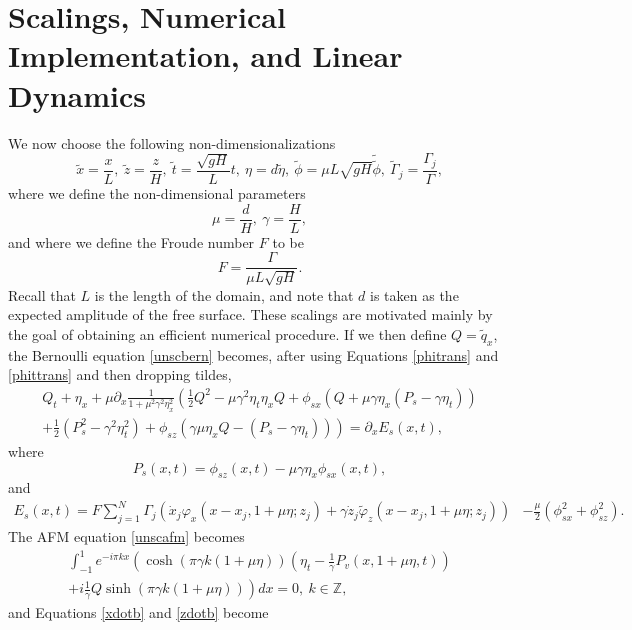 \documentclass[a4paper,11pt]{article}
\newcommand{\p}{\partial}
\begin{document}
\section{Scalings, Numerical Implementation, and Linear Dynamics}
We now choose the following non-dimensionalizations 
\[
\tilde{x} = \frac{x}{L}, ~\tilde{z} = \frac{z}{H}, ~ \tilde{t} = \frac{\sqrt{gH}}{L} t, ~ \eta = d\tilde{\eta}, ~ \tilde{\phi} = \mu L\sqrt{gH} \tilde{\tilde{\phi}}, ~ \tilde{\Gamma}_{j} = \frac{\Gamma_{j}}{\Gamma},
\]
where we define the non-dimensional parameters
\[
\mu= \frac{d}{H}, ~ \gamma = \frac{H}{L},
\]
and where we define the Froude number $F$ to be 
\[
F = \frac{\Gamma}{\mu L \sqrt{gH}}.
\]
Recall that $L$ is the length of the domain, and note that $d$ is taken as the expected amplitude of the free surface.  These scalings are motivated mainly by the goal of obtaining an efficient numerical procedure.  If we then define $Q = \tilde{q}_{x}$, the Bernoulli equation \eqref{unscbern} becomes, after using Equations \eqref{phitrans} and \eqref{phittrans} and then dropping tildes,  
\begin{multline}
Q_{t} + \eta_{x} + \mu\p_{x}\frac{1}{1+ \mu^{2}\gamma^{2}\eta_{x}^{2}} \left( \frac{1}{2}Q^{2} - \mu \gamma^{2}\eta_{t}\eta_{x}Q  +  \phi_{sx} (Q + \mu\gamma\eta_{x}( P_{s}-\gamma\eta_{t}))   \right. \\
\left. + \frac{1}{2}\left(P_{s}^{2}-\gamma^{2}\eta_{t}^{2} \right)+ \phi_{sz}\left(\gamma \mu \eta_{x}Q-\left(P_{s}-\gamma \eta_{t}\right) \right) \right)= \p_{x}E_{s}(x,t), \label{swbern}
\end{multline}
where 
\[
P_{s}(x,t) = \phi_{sz}(x,t)-\mu\gamma \eta_{x}\phi_{sx}(x,t),
\]
and
\begin{align*}
E_{s}(x,t) =  F\sum_{j=1}^{N}\Gamma_{j}\left(\dot{x}_{j}\varphi_{x}(x-x_{j},1+\mu\eta;z_{j}) + \gamma\dot{z}_{j}\tilde{\varphi}_{z}(x-x_{j},1+\mu\eta;z_{j}) \right)
& -\frac{\mu}{2}\left(\phi_{sx}^{2} + \phi_{sz}^{2}\right).
\end{align*}
The AFM equation \eqref{unscafm} becomes  
\begin{multline}
\int_{-1}^{1} e^{-i\pi k x}\left(\cosh\left( \pi\gamma k (1 + \mu \eta)\right)\left(\eta_{t} - \frac{1}{\gamma}P_{v}(x,1+\mu\eta,t) \right) \right.\\
\left.+i  \frac{1}{\gamma}Q\sinh\left(\pi \gamma k (1 + \mu \eta)\right)\right) dx = 0,~k\in\mathbb{Z},\label{finafm}
\end{multline}
and Equations \eqref{xdotb} and \eqref{zdotb} become
\end{document}
